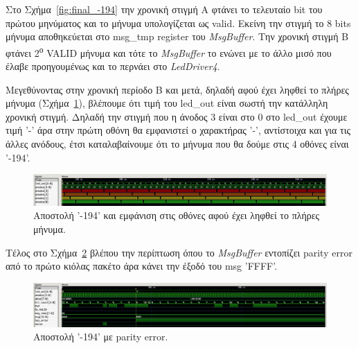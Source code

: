 \documentclass[../main.tex]{subfiles}
\begin{document}
Στο Σχήμα~\ref{fig:final_-194} την χρονική στιγμή A φτάνει το τελευταίο bit του
πρώτου μηνύματος και το μήνυμα υπολογίζεται ως valid. Εκείνη την στιγμή το 8
bits μήνυμα αποθηκεύεται στο msg\_tmp register του \textit{MsgBuffer}. Την
χρονική στιγμή B φτάνει 2\textsuperscript{ο} VALID μήνυμα και τότε το
\textit{MsgBuffer} το ενώνει με το άλλο μισό που έλαβε προηγουμένως και το
περνάει στο \textit{LedDriver4}.

Μεγεθύνοντας στην χρονική περίοδο B και μετά, δηλαδή αφού έχει ληφθεί το πλήρες
μήνυμα (Σχήμα~\ref{fig:final_ledout}), βλέπουμε ότι τιμή του led\_out είναι
σωστή την κατάλληλη χρονική στιγμή. Δηλαδή την στιγμή που η άνοδος 3 είναι στο 0
στο led\_out έχουμε τιμή '-' άρα στην πρώτη οθόνη θα εμφανιστεί ο χαρακτήρας
'-', αντίστοιχα και για τις άλλες ανόδους, έτσι καταλαβαίνουμε ότι το μήνυμα που
θα δούμε στις 4 οθόνες είναι '-194'.

\begin{figure}[H]
  \begin{center}
    \includegraphics[width=\textwidth]{../images/mymodule_ledout.png}
  \end{center}
  \caption{Αποστολή '-194' και εμφάνιση στις οθόνες αφού έχει ληφθεί το πλήρες
  μήνυμα.}
  \label{fig:final_ledout}
\end{figure}

Τέλος στο Σχήμα~\ref{fig:final_parity_error} βλέπου την περίπτωση όπου το
\textit{MsgBuffer} εντοπίζει parity error από το πρώτο κιόλας πακέτο άρα κάνει
την έξοδό του msg 'FFFF'.

\begin{figure}[H]
  \begin{center}
    \includegraphics[width=\textwidth]{../images/final_parity_error.png}
  \end{center}
  \caption{Αποστολή '-194' με parity error.}
  \label{fig:final_parity_error}
\end{figure}
\end{document}
